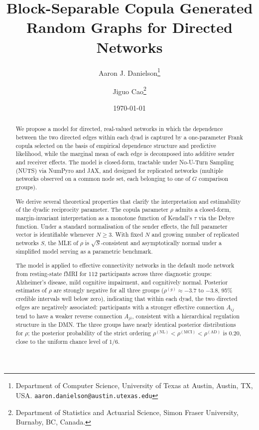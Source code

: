 \documentclass[12pt]{article}
\begin{document}
\title{Block-Separable Copula Generated Random Graphs for Directed Networks}
\author{Aaron J. Danielson\thanks{Department of Computer Science,
  University of Texas at Austin, Austin, TX, USA.
  \texttt{aaron.danielson@austin.utexas.edu}}
\and
Jiguo Cao\thanks{Department of Statistics and Actuarial Science,
  Simon Fraser University, Burnaby, BC, Canada.}}
\date{\today}
\maketitle


\begin{abstract}
\noindent
We propose a model for directed, real-valued networks in which the dependence
between the two directed edges within each dyad is captured by a one-parameter
Frank copula selected on the basis of empirical dependence structure and
predictive likelihood, while the marginal mean of each edge is decomposed into
additive sender and receiver effects.  The model is closed-form, tractable under No-U-Turn Sampling (NUTS) via NumPyro and JAX, and designed
for replicated networks (multiple
networks observed on a common node set, each belonging to one of $G$ comparison
groups).

We derive several theoretical properties that clarify the interpretation and
estimability of the dyadic reciprocity parameter.  The copula parameter $\rho$
admits a closed-form, margin-invariant interpretation as a monotone function of
Kendall's $\tau$ via the Debye function.  Under a standard normalisation of the
sender effects, the full parameter vector is identifiable whenever $N \geq 3$.
With fixed $N$ and growing number of replicated networks $S$, the MLE of $\rho$
is $\sqrt{S}$-consistent and asymptotically normal under a simplified model
serving as a parametric benchmark.

The model is applied to effective connectivity networks in the default mode
network from resting-state fMRI for 112 participants across three diagnostic
groups: Alzheimer's disease, mild cognitive impairment, and cognitively normal.
Posterior estimates of $\rho$ are strongly negative for all three groups
($\rho^{(g)} \approx -3.7$ to $-3.8$, 95\% credible intervals well below zero),
indicating that within each dyad, the two directed edges are negatively
associated: participants with a stronger effective connection $A_{ij}$ tend to
have a weaker reverse connection $A_{ji}$, consistent with a hierarchical
regulation structure in the DMN.  The three groups have nearly identical
posterior distributions for $\rho$; the posterior probability of the strict
ordering $\rho^{(\mathrm{NL})} < \rho^{(\mathrm{MCI})} < \rho^{(\mathrm{AD})}$
is $0.20$, close to the uniform chance level of $1/6$.
\end{abstract}
\end{document}
